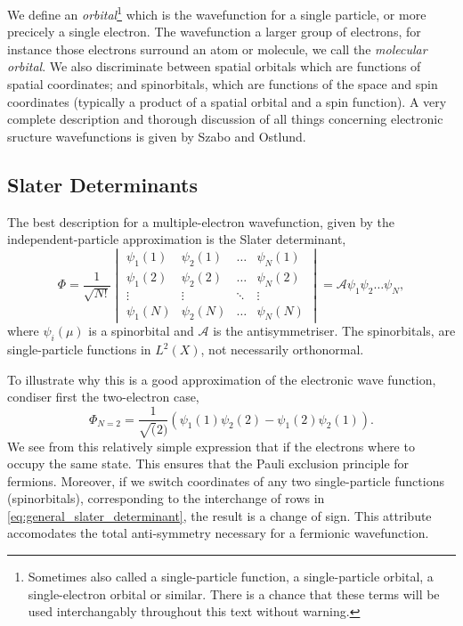         We define an \emph{orbital}\footnote{Sometimes also called a single-particle function,
        a single-particle orbital, a single-electron orbital or similar. There is a chance that 
        these terms will be used interchangably throughout this text without warning.} which is the
        wavefunction for a single particle, or more precicely a single electron. The wavefunction
        a larger group of electrons, for instance those electrons surround an atom or molecule,
        we call the \emph{molecular orbital}. We also discriminate between 
        spatial orbitals which are functions of spatial coordinates; and spinorbitals, which 
        are functions of the space and spin coordinates (typically a product of a spatial orbital
        and a spin function). A very complete description and thorough discussion of all things 
        concerning electronic sructure wavefunctions is given by Szabo and Ostlund\cite{szabo2012modern}. 

        \subsection{Slater Determinants}

        The best description for a multiple-electron wavefunction, given by the independent-particle
        approximation is the Slater determinant,
        \begin{equation}
            \label{eq:general_slater_determinant}
            \Phi = \frac{1}{\sqrt{N!}} \begin{vmatrix}
                \psi_1(1) & \psi_2(1) & \dots & \psi_N(1) \\
                \psi_1(2) & \psi_2(2) & \dots & \psi_N(2) \\
                \vdots & \vdots & \ddots & \vdots \\
                \psi_1(N) & \psi_2(N) & \dots & \psi_N(N)
            \end{vmatrix}
            = \mathscr{A}\psi_1 \psi_2 \dots \psi_N,
        \end{equation}
        where $\psi_i(\mu)$ is a spinorbital and $\mathscr{A}$ is the antisymmetriser. The
        spinorbitals, are single-particle functions in $L^2(X)$, not necessarily orthonormal.

        To illustrate why this is a good approximation of the electronic wave function,
        condiser first the two-electron case,
        \begin{equation}
            \Phi_{N=2} = \frac{1}{\sqrt(2)}(\psi_1(1)\psi_2(2) - \psi_1(2)\psi_2(1)).
        \end{equation}
        We see from this relatively simple expression that if the electrons where to occupy
        the same state. This ensures that the Pauli exclusion principle for 
        fermions\cite{pauli1925zusammenhang}. Moreover, if we switch coordinates of any two 
        single-particle functions (spinorbitals), corresponding to the interchange of rows in
        \autoref{eq:general_slater_determinant}, the result is a change of sign. This attribute
        accomodates the total anti-symmetry necessary for a fermionic wavefunction.       